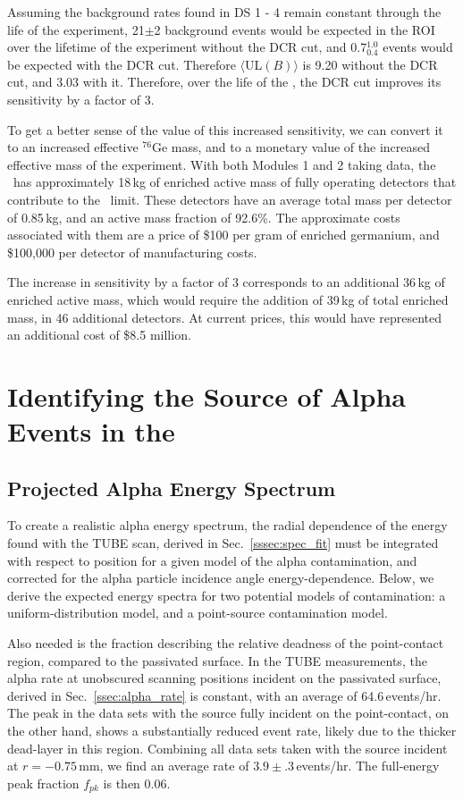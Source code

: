 Assuming the background rates found in DS 1 - 4 remain constant through the life of the experiment, 21$\pm$2 background events would be expected in the ROI over the lifetime of the experiment without the DCR cut, and 0.7$^{1.0}_{0.4}$ events would be expected with the DCR cut. Therefore $\langle$UL$(B)\rangle$ is 9.20 without the DCR cut, and 3.03 with it. Therefore, over the life of the \DEM, the DCR cut improves its sensitivity by a factor of 3. 

To get a better sense of the value of this increased sensitivity, we can convert it to an increased effective $^{76}$Ge mass, and to a monetary value of the increased effective mass of the experiment. With both Modules 1 and 2 taking data, the \DEM\ has approximately 18\,kg of enriched active mass of fully operating detectors that contribute to the \nonubb\ limit. These detectors have an average total mass per detector of 0.85\,kg, and an active mass fraction of 92.6\%. The approximate costs associated with them are a price of \$100 per gram of enriched germanium, and \$100,000 per detector of manufacturing costs. 

The increase in sensitivity by a factor of 3 corresponds to an additional 36\,kg of enriched active mass, which would require the addition of 39\,kg of total enriched mass, in 46 additional detectors. At current prices, this would have represented an additional cost of \$8.5 million.  

\section{Identifying the Source of Alpha Events in the \MJ\ \DEM\ }
\subsection{Projected Alpha Energy Spectrum}\label{ssec:alpha_model}
To create a realistic alpha energy spectrum, the radial dependence of the energy found with the TUBE scan, derived in Sec.~\ref{sssec:spec_fit} must be integrated with respect to position for a given model of the alpha contamination, and corrected for the alpha particle incidence angle energy-dependence. Below, we derive the expected energy spectra for two potential models of contamination: a uniform-distribution model, and a point-source contamination model.  

Also needed is the fraction describing the relative deadness of the point-contact region, compared to the passivated surface. In the TUBE measurements, the alpha rate at unobscured scanning positions incident on the passivated surface, derived in Sec.~\ref{ssec:alpha_rate} is constant, with an average of 64.6\,events/hr. The peak in the data sets with the source fully incident on the point-contact, on the other hand, shows a substantially reduced event rate, likely due to the thicker dead-layer in this region. Combining all data sets taken with the source incident at $r=-0.75$\,mm, we find an average rate of $3.9\pm.3$\,events/hr. The full-energy peak fraction $f_{pk}$ is then 0.06. 

